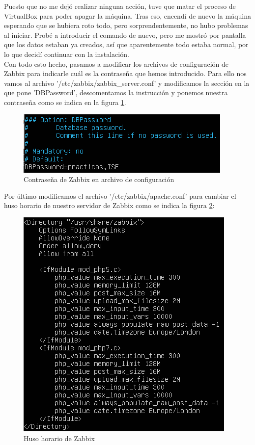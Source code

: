 Puesto que no me dejó realizar ninguna acción, tuve que matar el proceso de VirtualBox para poder apagar la máquina. Tras eso, encendí de nuevo la máquina esperando que se hubiera roto todo, pero sorprendentemente, no hubo problemas al iniciar. Probé a introducir el comando de nuevo, pero me mostró por pantalla que los datos estaban ya creados, así que aparentemente todo estaba normal,  por lo que decidí continuar con la instalación.\\

Con todo esto hecho, pasamos a modificar los archivos de configuración de Zabbix para indicarle cuál es la contraseña que hemos introducido. Para ello nos vamos al archivo '/etc/zabbix/zabbix\_server.conf' y modificamos la sección en la que pone 'DBPassword', descomentamos la instrucción y ponemos nuestra contraseña como se indica en la figura \ref{fig:zabbix-conf}.

\begin{figure}[H]
  \centering
  \includegraphics{Captura4}
  \caption{Contraseña de Zabbix en archivo de configuración}
  \label{fig:zabbix-conf}
\end{figure}

Por último modificamos el archivo '/etc/zabbix/apache.conf' para cambiar el huso horario de nuestro servidor de Zabbix como se indica la figura \ref{fig:zabbix-conf-apache}:

\begin{figure}[H]
  \centering
  \includegraphics[scale=0.9]{Captura5}
  \caption{Huso horario de Zabbix}
  \label{fig:zabbix-conf-apache}
\end{figure}

